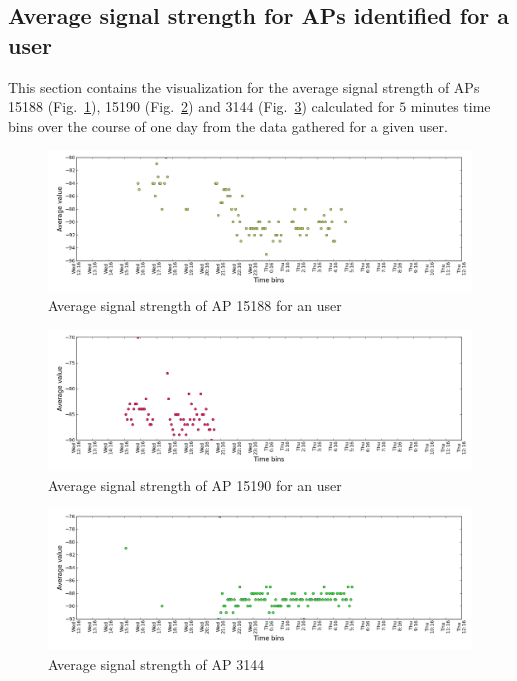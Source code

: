 \subsection{Average signal strength for APs identified for a user}
\label{appendix_avg_signal}

This section contains the visualization for the average signal strength of APs
15188 (Fig.~\ref{avg_6_2nd_day_1_A}), 15190 (Fig.~\ref{avg_6_2nd_day_2_A}) and
3144 (Fig.~\ref{avg_6_2nd_day_3_A}) calculated for $5$ minutes time bins over
the course of one day from the data gathered for a given user.

\begin{figure}[!h]
\centering
\includegraphics[width =\textwidth]{figures/combinations/user_6_sorted_1days_plot_15188_avg_sig.png}
\caption{Average signal strength of AP 15188 for an user}
\label{avg_6_2nd_day_1_A}
\end{figure}

\begin{figure}[!h]
\centering
\includegraphics[width =\textwidth]{figures/combinations/user_6_sorted_1days_plot_15190_avg_sig.png}
\caption{Average signal strength of AP 15190 for an user}
\label{avg_6_2nd_day_2_A}
\end{figure}

\begin{figure}[!h]
\centering
\includegraphics[width =\textwidth]{figures/combinations/user_6_sorted_1days_plot_3144_avg_sig.png}
\caption{Average signal strength of AP 3144}
\label{avg_6_2nd_day_3_A}
\end{figure}

